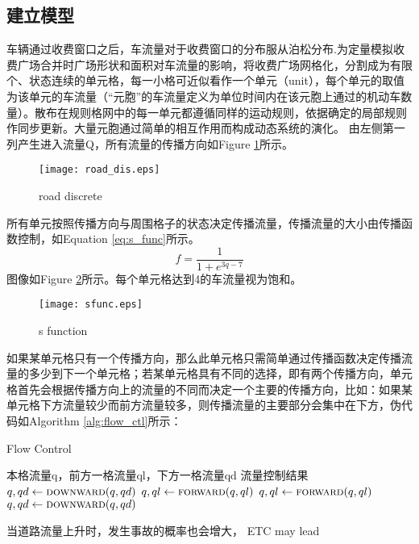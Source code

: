 \documentclass{mcmthesis}
\begin{document}
\subsection{建立模型}
车辆通过收费窗口之后，车流量对于收费窗口的分布服从泊松分布.为定量模拟收费广场合并时广场形状和面积对车流量的影响，将收费广场网格化，分割成为有限个、状态连续的单元格，每一小格可近似看作一个单元（unit），每个单元的取值为该单元的车流量（“元胞”的车流量定义为单位时间内在该元胞上通过的机动车数量）。散布在规则格网中的每一单元都遵循同样的运动规则，依据确定的局部规则作同步更新。大量元胞通过简单的相互作用而构成动态系统的演化。
由左侧第一列产生进入流量Q，所有流量的传播方向如Figure \ref{fig:road_dis}所示。
\begin{figure}[h]
\small
\centering
\texttt{[image: road\_dis.eps]}
\caption{road discrete} 
\label{fig:road_dis}
\end{figure}
所有单元按照传播方向与周围格子的状态决定传播流量，传播流量的大小由传播函数控制，如Equation \ref{eq:s_func}所示。
\begin{equation}
f=\frac{1}{1+e^{3q-7}}
\label{eq:s_func}
\end{equation}
图像如Figure \ref{fig:s_func}所示。每个单元格达到4的车流量视为饱和。
\begin{figure}[!htbp]
	\small
	\centering
	\texttt{[image: sfunc.eps]}
	\caption{s function} 
	\label{fig:s_func}
\end{figure}
如果某单元格只有一个传播方向，那么此单元格只需简单通过传播函数决定传播流量的多少到下一个单元格；若某单元格具有不同的选择，即有两个传播方向，单元格首先会根据传播方向上的流量的不同而决定一个主要的传播方向，比如：如果某单元格下方流量较少而前方流量较多，则传播流量的主要部分会集中在下方，伪代码如Algorithm \ref{alg:flow_ctl}所示：
\begin{algorithm}
	\begin{algorithmic}
	\caption{Flow Control}
	\label{alg:flow_ctl}
        \Require $\text{本格流量q，前方一格流量ql，下方一格流量qd}$
		\Ensure $\text{流量控制结果}$
					\State $q,qd \gets \Call{downward}{q,qd}$
					\State $q,ql \gets \Call{forward}{q,ql}$
				\Else
					\State $q,ql \gets \Call{forward}{q,ql}$
					\State $q,qd \gets \Call{downward}{q,qd}$
			\EndIf
			\State {}
		\EndFunction
\end{algorithmic}
\end{algorithm}

当道路流量上升时，发生事故的概率也会增大，
ETC may lead\cite{spiliopoulou2009toll}
\end{document}
